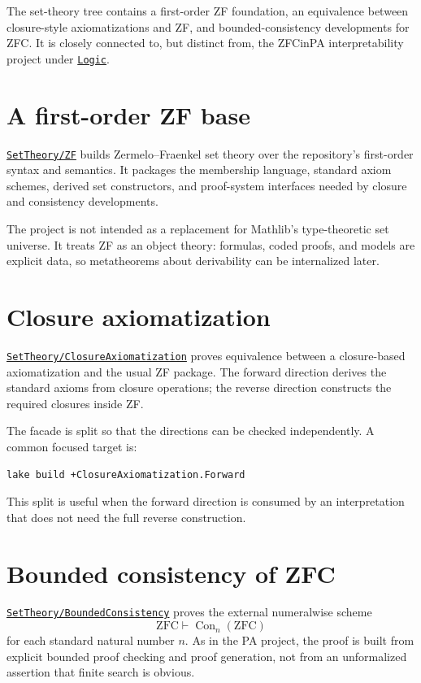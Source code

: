 \documentclass[
  10pt,
  a4paper,
  twoside,
  open=any,
  parskip=half,
  headings=big
]{scrreprt}
\newcommand{\CommitFull}{56a402bf82a9aab119fcbe3e96b991d387b221c5}
\newcommand{\RepoWeb}{https://github.com/VladimirReshetnikov/ProveIt}
\newcommand{\RepoTreeBase}{\RepoWeb/tree/\CommitFull}
\newcommand{\project}[1]{\textsf{#1}}
\newcommand{\RepoDir}[1]{\href{\RepoTreeBase/#1}{\nolinkurl{#1}}}
\begin{document}
The set-theory tree contains a first-order ZF foundation, an equivalence between closure-style axiomatizations and ZF, and bounded-consistency developments for ZFC. It is closely connected to, but distinct from, the \project{ZFCinPA} interpretability project under \RepoDir{Logic}.

\section{A first-order ZF base}
\label{sec:zf-base}

\RepoDir{SetTheory/ZF} builds Zermelo--Fraenkel set theory over the repository's first-order syntax and semantics. It packages the membership language, standard axiom schemes, derived set constructors, and proof-system interfaces needed by closure and consistency developments.

The project is not intended as a replacement for Mathlib's type-theoretic set universe. It treats ZF as an object theory: formulas, coded proofs, and models are explicit data, so metatheorems about derivability can be internalized later.

\section{Closure axiomatization}
\label{sec:closure-zf}

\RepoDir{SetTheory/ClosureAxiomatization} proves equivalence between a closure-based axiomatization and the usual ZF package. The forward direction derives the standard axioms from closure operations; the reverse direction constructs the required closures inside ZF.

The facade is split so that the directions can be checked independently. A common focused target is:

\begin{lstlisting}[language=bash]
lake build +ClosureAxiomatization.Forward
\end{lstlisting}

This split is useful when the forward direction is consumed by an interpretation that does not need the full reverse construction.

\section{Bounded consistency of ZFC}
\label{sec:bounded-zfc}

\RepoDir{SetTheory/BoundedConsistency} proves the external numeralwise scheme
\[
  \mathrm{ZFC}\vdash \operatorname{Con}_n(\mathrm{ZFC})
\]
for each standard natural number $n$. As in the PA project, the proof is built from explicit bounded proof checking and proof generation, not from an unformalized assertion that finite search is obvious.
\end{document}
